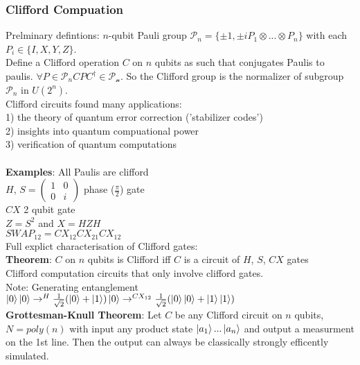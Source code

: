 \documentclass{article}
\begin{document}
                                        \subsubsection{Clifford Compuation}
                                        Prelminary defintions:
                                        $n$-qubit Pauli group $\mathcal{P}_n = \{ \pm 1, \pm i P_1 \otimes... \otimes P_n\}$ with each $P_i \in \{ I, X,Y,Z\}$.\\
                                        Define a Clifford operation $C$ on $n$ qubits as such that conjugates Paulis to paulis. $\forall P \in \mathcal{P}_n C P C^{\dagger} \in \mathcal{P_n}$. So the Clifford group is the normalizer of subgroup $\mathcal{P}_n$ in $U(2^n)$.\\
                                        Clifford circuits found many applications:\\
                                        1) the theory of quantum error correction ('stabilizer codes')\\
                                        2) insights into quantum compuational power\\
                                        3) verification of quantum computations\\\\
                                        \textbf{Examples}:
                                        All Paulis are clifford\\
                       $H$, $S = \begin{pmatrix} 1 & 0 \\0 & i \end{pmatrix} $ phase ($\frac{\pi}{2}$) gate\\
                       $CX$ 2 qubit gate\\
                       $Z= S^2$ and $X = HZH$\\
                       $SWAP_{12} = CX_{12} CX_{21} CX_{12}$\\
                       Full explict characterisation of Clifford gates:\\
                       \textbf{Theorem}: $C$ on $n$ qubits is Clifford iff $C$ is a circuit of $H$, $S$, $CX$ gates\\
                       Clifford computation circuits that only involve clifford gates.\\
                       Note: Generating entanglement $\ket{0} \ket{0} \rightarrow^{H} \frac{1}{\sqrt{2}} ( \ket{0} + \ket{1}) \ket{0} \rightarrow^{CX_{12}} \frac{1}{\sqrt{2}} ( \ket{0} \ket{0} + \ket{1} \ket{1})$\\
               \textbf{Grottesman-Knull Theorem}: Let $C$ be any Clifford circuit on $n$ qubits, $N = poly(n)$ with input any product state $\ket{a_1} ... \ket{a_n}$ and output a measurment on the 1st line. Then the output can always be classically strongly efficently simulated.
\end{document}
